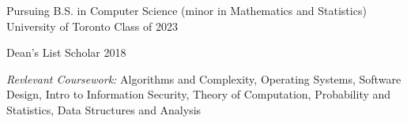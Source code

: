 
\begin{cventries}
  \cventry
    {Pursuing B.S. in Computer Science (minor in Mathematics and Statistics) } %
    {University of Toronto} %
    {} %
    {Class of 2023} %
    {
      \begin{cvitems} 
      	\item {Dean's List Scholar 2018}
         \item {\textit{Revlevant Coursework:} Algorithms and Complexity, Operating Systems, Software Design, Intro to Information Security, Theory of Computation, Probability and Statistics, Data Structures and Analysis}
      \end{cvitems}
    }
\end{cventries}
